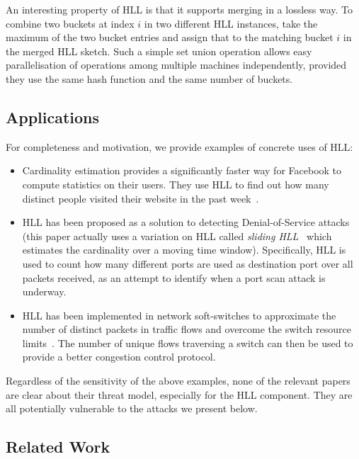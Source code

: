 \documentclass{IEEEtran}
\begin{document}
An interesting property of HLL is that it supports merging in a lossless way. To combine two buckets at index $i$ in two different HLL instances, take the maximum of the two bucket entries and assign that to the matching bucket $i$ in the merged HLL sketch. Such a simple set union operation allows easy parallelisation of operations among multiple machines independently, provided they use the same hash function and the same number of buckets.

\subsection{Applications}
For completeness and motivation, we provide examples of concrete uses of HLL:
\begin{itemize}
    \item Cardinality estimation provides a significantly faster way for Facebook to compute statistics on their users. They use HLL to find out how many distinct people visited their website in the past week~\cite{fbhll}.
    \item HLL has been proposed as a solution to detecting Denial-of-Service attacks~\cite{portscanhll} (this paper actually uses a variation on HLL called \emph{sliding HLL}~\cite{slidinghll} which estimates the cardinality over a moving time window). Specifically, HLL is used to count how many different ports are used as destination port over all packets received, as an attempt to identify when a port scan attack is underway.
    \item HLL has been implemented in network soft-switches to approximate the number of distinct packets in traffic flows and overcome the switch resource limits~\cite{flexswitch}. The number of unique flows traversing a switch can then be used to provide a better congestion control protocol.
\end{itemize}

Regardless of the sensitivity of the above examples, none of the relevant papers are clear about their threat model, especially for the HLL component.  They are all potentially vulnerable to the attacks we present below.

\subsection{Related Work}
\end{document}
